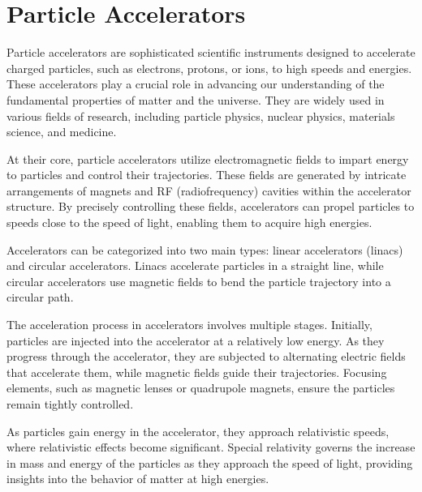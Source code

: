 \documentclass[a4paper,oneside,12pt]{report}
\numberwithin{equation}{chapter}
\begin{document}
\newpage



\section{Particle Accelerators}

Particle accelerators are sophisticated scientific instruments designed to accelerate charged particles, such as electrons, protons, or ions, to high speeds and energies. 
These accelerators play a crucial role in advancing our understanding of the fundamental properties of matter and the universe. 
They are widely used in various fields of research, including particle physics, nuclear physics, materials science, and medicine.

At their core, particle accelerators utilize electromagnetic fields to impart energy to particles and control their trajectories. 
These fields are generated by intricate arrangements of magnets and RF (radiofrequency) cavities within the accelerator structure. 
By precisely controlling these fields, accelerators can propel particles to speeds close to the speed of light, enabling them to acquire high energies.

Accelerators can be categorized into two main types: linear accelerators (linacs) and circular accelerators. 
Linacs accelerate particles in a straight line, while circular accelerators use magnetic fields to bend the particle trajectory into a circular path. 

The acceleration process in accelerators involves multiple stages. Initially, particles are injected into the accelerator at a relatively low energy. 
As they progress through the accelerator, they are subjected to alternating electric fields that accelerate them, while magnetic fields guide their trajectories.
Focusing elements, such as magnetic lenses or quadrupole magnets, ensure the particles remain tightly controlled.

As particles gain energy in the accelerator, they approach relativistic speeds, where relativistic effects become significant. 
Special relativity governs the increase in mass and energy of the particles as they approach the speed of light, providing insights into the behavior of matter at high energies.
\end{document}

